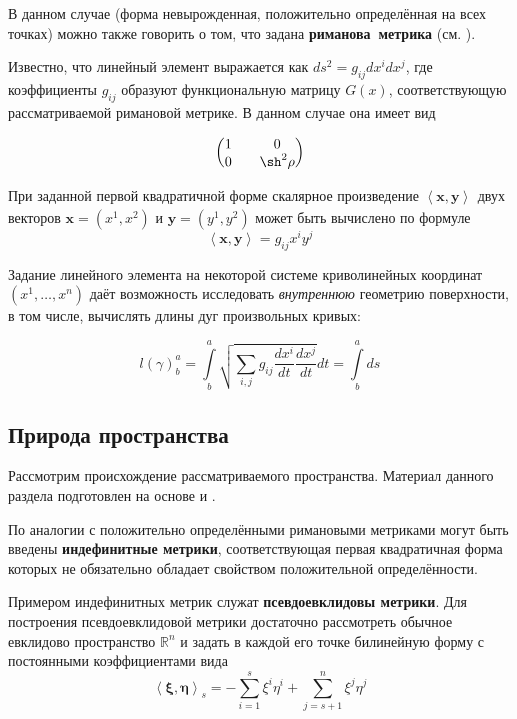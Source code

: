 \documentclass{article}
\numberwithin{equation}{section}
\newcommand{\neword}[1]{\textbf{#1}}
\newcommand{\scalmult}[2]{{\left \langle #1 \right \rangle}_{#2}}
\renewcommand{\vec}{\mathbf}
\begin{document}
В данном случае (форма невырожденная, положительно определённая на
всех точках) можно также говорить о том, что задана
\neword{риманова метрика} (см. \cite{dubrovin98}).

Известно, что линейный элемент выражается как
\mbox{$ds^2=g_{ij}dx^idx^j$}, где коэффициенты $g_{ij}$ образуют
функциональную матрицу $G(x)$, соответствующую рассматриваемой
римановой метрике. В данном случае она имеет вид

\begin{equation*}
  \begin{pmatrix}
    1 && 0 \\
    0 && \sh^2{\rho}
  \end{pmatrix}
\end{equation*}

При заданной первой квадратичной форме скалярное произведение
$\scalmult{\vec{x}, \vec{y}}{}$ двух векторов $\vec{x}=(x^1,x^2)$ и
$\vec{y}=(y^1,y^2)$ может быть вычислено по формуле
\begin{equation}\label{eq:scalmult}
  \scalmult{\vec{x}, \vec{y}}{} = g_{ij}x^i y^j
\end{equation}

Задание линейного элемента на некоторой системе криволинейных
координат $(x^1, \dotsc , x^n)$ даёт возможность исследовать
\emph{внутреннюю} геометрию поверхности, в том числе, вычислять длины
дуг произвольных кривых:

\begin{equation}\label{eq:riemann-curve-length}
  l(\gamma)^a_b = \int \limits^a_b {\sqrt{\sum_{i,j}{g_{ij}
        \frac{dx^i}{dt} \frac{dx^j}{dt}}} dt} = \int \limits^a_b ds
\end{equation}

\subsection{Природа пространства}
\label{sec:what-is-up}
Рассмотрим происхождение рассматриваемого пространства. Материал
данного раздела подготовлен на основе \cite{fomenko00} и
\cite{dubrovin98}.

По аналогии с положительно определёнными римановыми метриками могут
быть введены \neword{индефинитные метрики}, соответствующая первая
квадратичная форма которых не обязательно обладает свойством
положительной определённости.

Примером индефинитных метрик служат \neword{псевдоевклидовы метрики}.
Для построения псевдоевклидовой метрики достаточно рассмотреть обычное
евклидово пространство $\mathbb{R}^n$ и задать в каждой его точке
билинейную форму с постоянными коэффициентами вида
\begin{equation*}
  \scalmult{\vec{\xi}, \vec{\eta}}{s} = -\sum_{i=1}^s {\xi^i \eta^i} +
\sum_{j=s+1}^n {\xi^j \eta^j}
\end{equation*}
\end{document}
